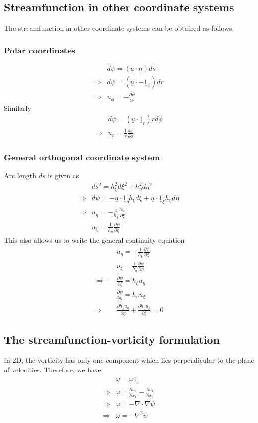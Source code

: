 \documentclass[11pt,a4paper]{article}
\newcommand{\pd}[2]{\frac{\partial #1}{\partial #2}}
\newcommand{\vect}[1]{\underline{#1}}
\newcommand{\1}{\vect{1}}
\newcommand{\grad}{\nabla}
\newcommand{\RA}{\Rightarrow}
\newcommand{\vu}{\vect{u}}
\begin{document}
\subsection{Streamfunction in other coordinate systems}
The streamfunction in other coordinate systems can be obtained as follows:
\subsubsection{Polar coordinates}
\begin{align*}
&d\psi = (\vu \cdot \vect n)ds\\
\RA&d\psi = (\vu \cdot -\1_\phi)dr \tag{radial velocity}\\ 
\RA&u_\phi = -\pd{\psi}{r}
\end{align*}
Similarly
\begin{align*}
&d\psi = (\vu \cdot \1_r)rd\phi \tag{azimuthal velocity}\\ 
\RA&u_r = \frac{1}{r}\pd{\psi}{\phi}
\end{align*}

\subsubsection{General orthogonal coordinate system}
Arc length $ds$ is given as
\begin{align*}
&ds^2 = h_\xi^2d\xi^2 + h_\eta^2d\eta^2\\
\RA& d\psi = -\vu\cdot\1_\eta h_\xi d\xi + \vu\cdot\1_\xi h_\eta d\eta\\
\RA& u_\eta = -\frac{1}{h_\xi}\pd{\psi}{\xi}\\
& u_\xi = \frac{1}{h_\eta}\pd{\psi}{\eta}
\end{align*}
This also allows us to write the general continuity equation
\begin{align*}
& u_\eta = -\frac{1}{h_\xi}\pd{\psi}{\xi}\\
& u_\xi = \frac{1}{h_\eta}\pd{\psi}{\eta}\\
\RA  -&\pd{\psi}{\xi} = h_\xi u_\eta\\
&\pd{\psi}{\eta} = h_\eta u_\xi\\
\RA &\pd{h_\xi u_\eta}{\eta} + \pd{h_\eta u_\xi}{\xi} = 0
\end{align*}

\subsection{The streamfunction-vorticity formulation}
In 2D, the vorticity has only one component which lies perpendicular to the plane of velocities. Therefore, we have
\begin{align*}
&\vect \omega = \omega \1_z\\
\RA& \omega = \pd{u_2}{x_1} - \pd{u_1}{x_2}\\
\RA& \omega = -\grad\cdot\grad\psi\\
\RA& \omega = -\grad^2\psi
\end{align*}
\end{document}
